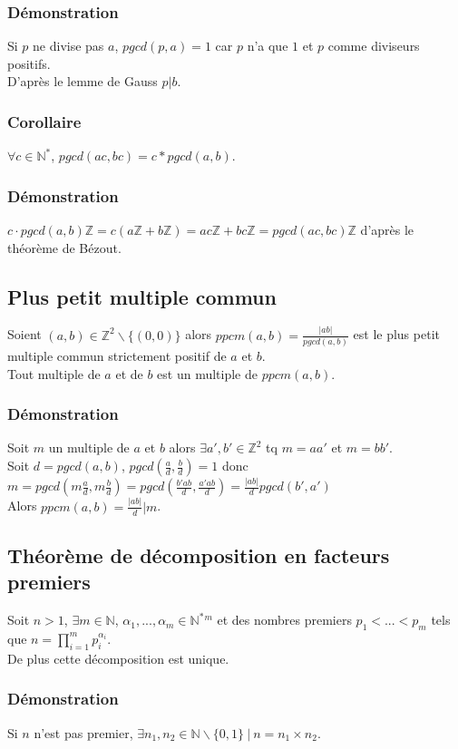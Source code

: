 \documentclass[a4paper,10pt]{book} %
\newcommand{\N}{\mathbb{N}}
\newcommand{\Z}{\mathbb{Z}}
\newcommand{\tq}{~|~}
\begin{document}
\subsubsection{Démonstration}
Si $p$ ne divise pas $a$, $pgcd(p,a)=1$ car $p$ n'a que $1$ et $p$ comme diviseurs positifs.\\
D'après le lemme de Gauss $p|b$.

\subsubsection{Corollaire}
$\forall c\in \N^*$, $pgcd(ac,bc)=c*pgcd(a,b)$.

\subsubsection{Démonstration}
$c\cdot pgcd(a,b)\Z=c(a\Z+b\Z)=ac\Z+bc\Z=pgcd(ac,bc)\Z$ d'après le théorème de Bézout.

\subsection{Plus petit multiple commun}
Soient $(a,b)\in\Z^2\backslash\{(0,0)\}$ alors $ppcm(a,b)=\frac{|ab|}{pgcd(a,b)}$ est le plus petit multiple commun strictement positif de $a$ et $b$.\\
Tout multiple de $a$ et de $b$ est un multiple de $ppcm(a,b)$.

\subsubsection{Démonstration}
Soit $m$ un multiple de $a$ et $b$ alors $\exists a',b'\in \Z^2$ tq $m=aa'$ et $m=bb'$.\\
Soit $d=pgcd(a,b)$, $pgcd(\frac{a}{d},\frac{b}{d})=1$ donc $m=pgcd(m\frac{a}{d},m\frac{b}{d})=pgcd(\frac{b'ab}{d},\frac{a'ab}{d})=\frac{|ab|}{d}pgcd(b',a')$\\
Alors $ppcm(a,b)=\frac{|ab|}{d} | m$.

\subsection{Théorème de décomposition en facteurs premiers}
Soit $n>1$, $\exists m\in \N$, $\alpha_1,...,\alpha_m\in\N^*{}^m$ et des nombres premiers $p_1<$...$<p_m$ tels que $\displaystyle n=\prod_{i=1}^mp_i^{\alpha_i}$.\\
De plus cette décomposition est unique.

\subsubsection{Démonstration}
Si $n$ n'est pas premier, $\exists n_1,n_2\in \N\backslash\{0,1\}\tq n=n_1\times n_2$.
\end{document}
